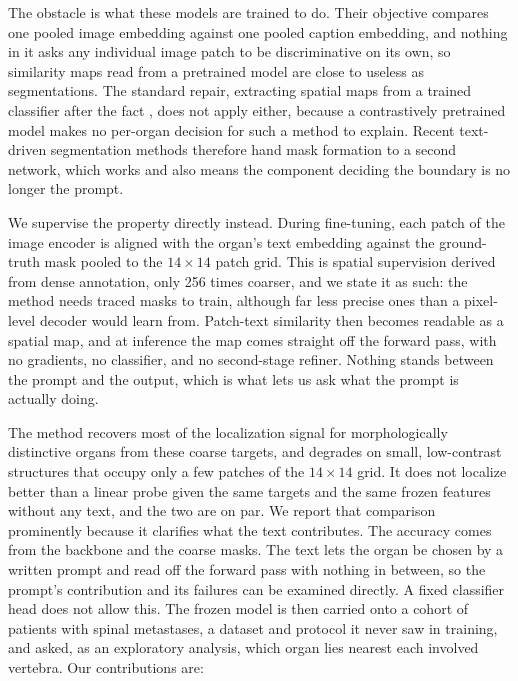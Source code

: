 \documentclass[10pt]{article}
\begin{document}
The obstacle is what these models are trained to do. Their objective compares one
pooled image embedding against one pooled caption embedding, and nothing in it
asks any individual image patch to be discriminative on its own, so similarity
maps read from a pretrained model are close to useless as segmentations. The
standard repair, extracting spatial maps from a trained classifier after the fact
\cite{zhou2016cam, selvaraju2017gradcam}, does not apply either, because a
contrastively pretrained model makes no per-organ decision for such a method to
explain. Recent text-driven segmentation methods therefore hand mask formation to
a second network, which works and also means the component deciding the boundary
is no longer the prompt.

We supervise the property directly instead. During fine-tuning, each patch of the
image encoder is aligned with the organ's text embedding against the ground-truth
mask pooled to the $14\times14$ patch grid. This is spatial supervision derived
from dense annotation, only 256 times coarser, and we state it as such: the
method needs traced masks to train, although far less precise ones than a
pixel-level decoder would learn from. Patch-text similarity then becomes readable
as a spatial map, and
at inference the map comes straight off the forward pass, with no gradients, no
classifier, and no second-stage refiner. Nothing stands between the prompt and the
output, which is what lets us ask what the prompt is actually doing.

The method recovers most of the localization signal for morphologically
distinctive organs from these coarse targets, and degrades on small, low-contrast
structures that occupy only a few patches of the $14\times14$ grid. It does not
localize better than a linear probe given the same targets and the same frozen
features without any text, and the two are on par. We report that comparison
prominently because it clarifies what the text contributes. The accuracy comes
from the backbone and the coarse masks. The text lets the organ be chosen by a
written prompt and read off the forward pass with nothing in between, so the
prompt's contribution and its failures can be examined directly. A fixed classifier head does not allow this.
The frozen model is then carried onto a cohort of patients with spinal
metastases, a dataset and protocol it never saw in training, and asked, as an
exploratory analysis, which organ lies nearest each involved vertebra. Our
contributions are:
\end{document}
